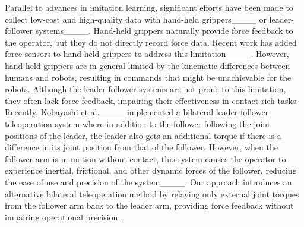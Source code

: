 Parallel to advances in imitation learning, significant efforts have been made to collect low-cost and high-quality data with hand-held grippers____ or leader-follower systems____. Hand-held grippers naturally provide force feedback to the operator, but they do not directly record force data. Recent work has added force sensors to hand-held grippers to address this limitation____. However, hand-held grippers are in general limited by the kinematic differences between humans and robots, resulting in commands that might be unachievable for the robots.
Although the leader-follower systems are not prone to this limitation, they often lack force feedback, impairing their effectiveness in contact-rich tasks. Recently, Kobayashi et al.____ implemented a bilateral leader-follower teleoperation system where in addition to the follower following the joint positions of the leader, the leader also gets an additional torque if there is a difference in its joint position from that of the follower.
However, when the follower arm is in motion without contact, this system causes the operator to experience inertial, frictional, and other dynamic forces of the follower, reducing the ease of use and precision of the system____. Our approach introduces an alternative bilateral teleoperation method by relaying only external joint torques from the follower arm back to the leader arm, providing force feedback without impairing operational precision.